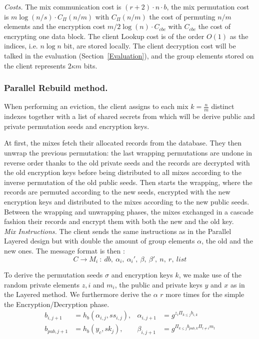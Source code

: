 \documentclass{llncs}
\begin{document}
\noindent\textit{Costs.} The mix communication cost is $ (r+2) \cdot n \cdot b$, the mix permutation cost is $m \log(n/s) \cdot C_{\Pi}(n/m)$ with $C_{\Pi}(n/m)$ the cost of permuting $n/m$ elements and the encryption cost $m/2 \log(n)\cdot  C_{cbc}$ with $C_{cbc}$ the cost of encrypting one data block. The client Lookup cost is of the order $O(1)$ as the indices, i.e. $n\log n$ bit, are stored locally. The client decryption cost will be talked in the evaluation (Section~\ref{Evaluation}), and the group elements stored on the client represents $2\kappa m$ bits.

\subsubsection{Parallel Rebuild method.}
When performing an eviction, the client assigns to each mix  $k=\frac{n}{m}$ distinct indexes together with a list of shared secrets from which will be derive public and private permutation seeds and encryption keys.

At first, the mixes fetch their allocated records from the database. They then unwrap the previous permutation: the last wrapping permutations are undone in reverse order thanks to the old private seeds and the records are decrypted with the old encryption keys before being distributed to all mixes according to the inverse permutation of the old public seeds. Then starts the wrapping, where the records are permuted according to the new seeds, encrypted with the new encryption keys and distributed to the mixes according to the new public seeds. Between the wrapping and unwrapping phases, the mixes exchanged in a cascade fashion their records and encrypt them with both the new and the old key.\\

\noindent\textit{Mix Instructions.}
The client sends the same instructions as in the Parallel Layered design but with double the amount of group elements $\alpha$, the old and the new ones. The message format is then : 
$$C \rightarrow M_i\ :\ db,\  \alpha_i,\ \alpha_i',\ \beta,\ \beta',\ n,\ r,\ list$$

To derive the permutation seeds $\sigma$ and encryption keys $k$, we make use of the random private elements $z,i$ and $m_i$, the public and private keys $y$ and $x$ as in the Layered method. We furthermore derive the $\alpha$ $r$ more times for the simple the Encryption/Decryption phase. 
\begin{align*}
b_{i,j+1}&=h_b(\alpha_{i,j}, ss_{i,j}), & \alpha_{i,j+1} &= g^{z_i\Pi_{k\leq j}b_{i,k}}\\
b_{pub,j+1}&=h_b(y_c, sk_{j}), &\beta_{i, j+1} &= g^{\Pi_{k\leq j}b_{pub,k}\Pi_{l\neq i}m_l}\\
\end{align*}
\end{document}
